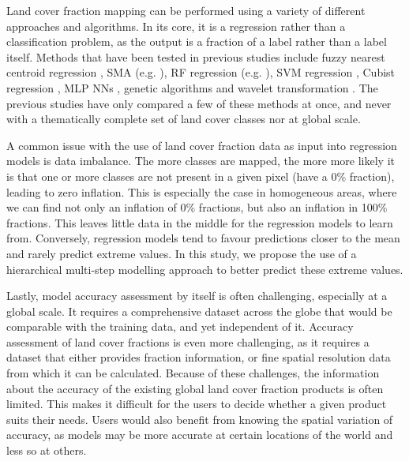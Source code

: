 \documentclass[review,authoryear,3p]{elsarticle}
\begin{document}
Land cover fraction mapping can be performed using a variety of different approaches and algorithms.
In its core, it is a regression rather than a classification problem, as the output is a fraction of a label rather than a label itself.
Methods that have been tested in previous studies include fuzzy nearest centroid regression \citep{zhang2001fullyfuzzy}, \ac{SMA} (e.g. \citealp{shimabukuro1991least, adams_classification_1995, hobbs2003linear, yang_landsat_2012}), \ac{RF} regression (e.g. \citealp{walton2008subpixelrf}), \gls{SVM} regression \citep{walton2008subpixelrf}, Cubist regression \citep{walton2008subpixelrf}, \gls{MLP} \glspl{NN} \citep{zhang2001fullyfuzzy}, genetic algorithms \citep{stavrakoudis_boosted_2011} and wavelet transformation \citep{uma_shankar_wavelet-fuzzy_2011}.
The previous studies have only compared a few of these methods at once, and never with a thematically complete set of land cover classes nor at global scale.

A common issue with the use of land cover fraction data as input into regression models is data imbalance.
The more classes are mapped, the more more likely it is that one or more classes are not present in a given pixel (have a 0\% fraction), leading to zero inflation.
This is especially the case in homogeneous areas, where we can find not only an inflation of 0\% fractions, but also an inflation in 100\% fractions.
This leaves little data in the middle for the regression models to learn from.
Conversely, regression models tend to favour predictions closer to the mean and rarely predict extreme values.
In this study, we propose the use of a hierarchical multi-step modelling approach to better predict these extreme values.

Lastly, model accuracy assessment by itself is often challenging, especially at a global scale.
It requires a comprehensive dataset across the globe that would be comparable with the training data, and yet independent of it.
Accuracy assessment of land cover fractions is even more challenging, as it requires a dataset that either provides fraction information, or fine spatial resolution data from which it can be calculated.
Because of these challenges, the information about the accuracy of the existing global land cover fraction products is often limited.
This makes it difficult for the users to decide whether a given product suits their needs.
Users would also benefit from knowing the spatial variation of accuracy, as models may be more accurate at certain locations of the world and less so at others.
\end{document}
